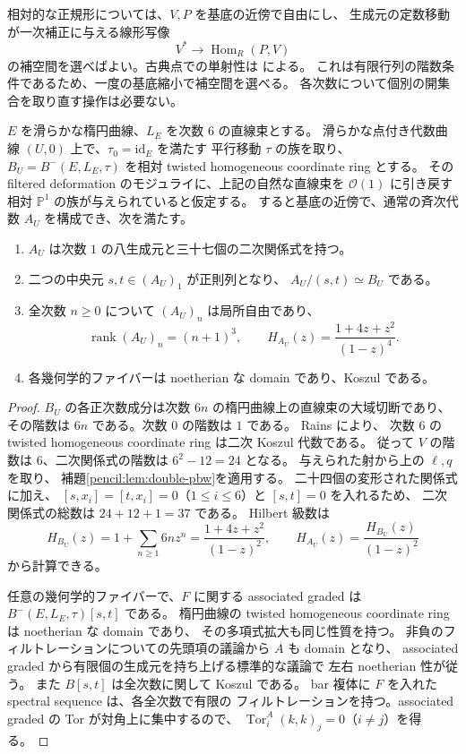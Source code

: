 相対的な正規形については、$V,P$ を基底の近傍で自由にし、
生成元の定数移動が一次補正に与える線形写像
\[
 V^*\longrightarrow\operatorname{Hom}_R(P,V)
\]
の補空間を選べばよい。古典点での単射性は
\cite[系2.5]{PencilRainsFiltered} による。
これは有限行列の階数条件であるため、一度の基底縮小で補空間を選べる。
各次数について個別の開集合を取り直す操作は必要ない。

\begin{proposition}\label{pencil:prop:degree-six-central-extension}
$E$ を滑らかな楕円曲線、$L_E$ を次数 $6$ の直線束とする。
滑らかな点付き代数曲線 $(U,0)$ 上で、$\tau_0=\mathrm{id}_E$ を満たす
平行移動 $\tau$ の族を取り、
$B_U=B^{-}(E,L_E,\tau)$ を相対 twisted homogeneous coordinate ring とする。
その filtered deformation のモジュライに、上記の自然な直線束を
$\mathcal O(1)$ に引き戻す相対 $\mathbb P^1$ の族が与えられていると仮定する。
すると基底の近傍で、通常の斉次代数 $A_U$ を構成でき、次を満たす。
\begin{enumerate}
 \item $A_U$ は次数 $1$ の八生成元と三十七個の二次関係式を持つ。
 \item 二つの中央元 $s,t\in(A_U)_1$ が正則列となり、
 $A_U/(s,t)\simeq B_U$ である。
 \item 全次数 $n\geq0$ について $(A_U)_n$ は局所自由であり、
 \[
 \operatorname{rank}(A_U)_n=(n+1)^3,
 \qquad
 H_{A_U}(z)=\frac{1+4z+z^2}{(1-z)^4}.
 \]
 \item 各幾何学的ファイバーは noetherian な domain であり、Koszul である。
\end{enumerate}
\end{proposition}

\begin{proof}
$B_U$ の各正次数成分は次数 $6n$ の楕円曲線上の直線束の大域切断であり、
その階数は $6n$ である。次数 $0$ の階数は $1$ である。
Rains \cite[定理3.19]{PencilRainsFiltered} により、
次数 $6$ の twisted homogeneous coordinate ring は二次 Koszul 代数である。
従って $V$ の階数は $6$、二次関係式の階数は $6^2-12=24$ となる。
与えられた射から上の $\ell,q$ を取り、
補題\ref{pencil:lem:double-pbw}を適用する。
二十四個の変形された関係式に加え、
$[s,x_i]=[t,x_i]=0$（$1\leq i\leq6$）と $[s,t]=0$ を入れるため、
二次関係式の総数は $24+12+1=37$ である。
Hilbert 級数は
\[
 H_{B_U}(z)=1+\sum_{n\geq1}6nz^n
 =\frac{1+4z+z^2}{(1-z)^2},
 \qquad
 H_{A_U}(z)=\frac{H_{B_U}(z)}{(1-z)^2}
\]
から計算できる。

任意の幾何学的ファイバーで、$F$ に関する associated graded は
$B^{-}(E,L_E,\tau)[s,t]$ である。
楕円曲線の twisted homogeneous coordinate ring は noetherian な domain であり、
その多項式拡大も同じ性質を持つ。
非負のフィルトレーションについての先頭項の議論から $A$ も domain となり、
associated graded から有限個の生成元を持ち上げる標準的な議論で
左右 noetherian 性が従う。
また $B[s,t]$ は全次数に関して Koszul である。
bar 複体に $F$ を入れた spectral sequence は、各全次数で有限の
フィルトレーションを持つ。associated graded の Tor が対角上に集中するので、
$\operatorname{Tor}^{A}_i(k,k)_j=0$（$i\ne j$）を得る。
\end{proof}


